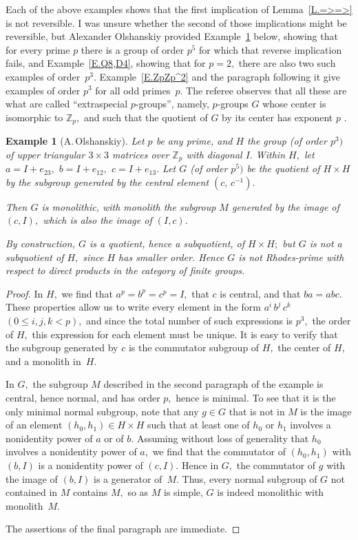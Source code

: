 \documentclass{amsart}
\newtheorem{example}[theorem]{Example}
\numberwithin{equation}{section}
\numberwithin{theorem}{section}
\newcommand{\Z}{\mathbb{Z}}
\begin{document}
Each of the above examples shows that the first
implication of Lemma~\ref{L.=>=>} is not reversible.
I was unsure whether the second of those implications might be
reversible, but Alexander Olshanskiy provided Example~\ref{E.p^5} below,
showing that for every prime $p$ there is a group of
order $p^5$ for which that reverse implication fails,
and Example~\ref{E.Q8,D4},
showing that for $p=2,$ there are also two such examples of order~$p^3.$
Example~\ref{E.ZpZp^2} and the paragraph following it give
examples of order $p^3$ for all odd primes~$p.$
The referee observes that all these are what are called
``extraspecial $\!p$-groups'', namely, $\!p$-groups $G$
whose center is isomorphic to $\Z_p,$ and such that
the quotient of $G$ by its center has exponent $p$ \cite{wiki_extrsp}.

\begin{example}[A.\,Olshanskiy]\label{E.p^5}
Let $p$ be any prime, and $H$ the group {\rm(}of order $p^3)$
of upper triangular
$3\times 3$ matrices over $\Z_p$ with diagonal $I.$
Within $H,$ let $a=I+e_{23},$ $b=I+e_{12},$ $c=I+e_{13}.$
Let $G$ {\rm(}of order $p^5)$ be the quotient of $H\times H$ by the
subgroup generated by the central element $(c,\,c^{-1}).$

Then $G$ is monolithic, with monolith the subgroup $M$
generated by the image of $(c,I),$ which is also the image of $(I,c).$

By construction, $G$ is a quotient, hence a subquotient, of
$H\times H;$ but $G$ is not a subquotient of $H,$
since $H$ has smaller order.
Hence $G$ is not Rhodes-prime with respect to direct products
in the category of finite groups.
\end{example}

\begin{proof}
In $H,$ we find that $a^p=b^p=c^p=I,$ that $c$ is central,
and that $ba=abc.$
These properties allow us to write every element in the form
$a^i\,b^j\,c^k$ $(0\leq i,j,k<p),$ and since the total number of
such expressions is $p^3,$ the order of $H,$ this expression
for each element must be unique.
It is easy to verify that the subgroup generated by $c$ is
the commutator subgroup of $H,$ the center of $H,$
and a monolith in~$H.$

In $G,$ the subgroup $M$ described in the second
paragraph of the example is central, hence
normal, and has order $p,$ hence is minimal.
To see that it is the only minimal normal subgroup, note that
any $g\in G$ that is not in $M$ is the image of an
element $(h_0,h_1)\in H\times H$ such that at least
one of $h_0$ or $h_1$ involves a nonidentity power of $a$ or of $b.$
Assuming without loss of generality that $h_0$
involves a nonidentity power of $a,$ we find that the
commutator of $(h_0,h_1)$ with $(b,I)$ is a nonidentity
power of $(c,I).$
Hence in $G,$ the commutator of $g$ with
the image of $(b,I)$ is a generator of~$M.$
Thus, every normal subgroup of $G$ not contained in $M$ contains $M,$
so as $M$ is simple, $G$ is indeed monolithic with monolith~$M.$

The assertions of the final paragraph are immediate.
\end{proof}
\end{document}
